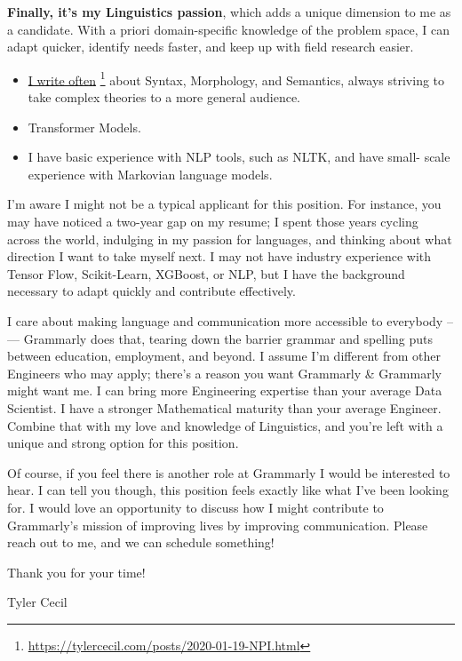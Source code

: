 \documentclass[]{article}
\newcommand{\cvcolor}[1]{{\color{MidnightBlue}#1}}
\newcommand{\hl}[1]{\cvcolor{\textbf{#1}}}
\renewcommand{\cite}[2]{\href{#2}{#1} \footnote{\href{#2}{#2}}}
\begin{document}
\begin{adjustwidth}{40pt}{40pt}
  \hl{Finally, it's my Linguistics passion}, which adds a unique dimension
  to me as a candidate. With a priori domain-specific knowledge of the problem
  space, I can adapt quicker, identify needs faster, and keep up with field
  research easier.
  \begin{itemize}
    \item \cite{I write
      often}{https://tylercecil.com/posts/2020-01-19-NPI.html} about Syntax,
      Morphology, and Semantics, always striving to take complex theories to a
      more general audience.
    \item Transformer Models.
    \item I have basic experience with NLP tools, such as NLTK, and have small-
      scale experience with Markovian language models.
  \end{itemize}\medskip

  I'm aware I might not be a typical applicant for this position. For instance,
  you may have noticed a two-year gap on my resume; I spent those years cycling
  across the world, indulging in my passion for languages, and thinking about
  what direction I want to take myself next. I may not have industry experience
  with Tensor Flow, Scikit-Learn, XGBoost, or NLP, but I have the background
  necessary to adapt quickly and contribute effectively.\medskip

  I care about making language and communication more accessible to everybody
  --— Grammarly does that, tearing down the barrier grammar and spelling puts
  between education, employment, and beyond. I assume I'm different from
  other Engineers who may apply; there's a reason you want Grammarly &
  Grammarly might want me. I can bring more Engineering expertise than your
  average Data Scientist. I have a stronger Mathematical maturity than your
  average Engineer. Combine that with my love and knowledge of Linguistics,
  and you're left with a unique and strong option for this position. \medskip

  Of course, if you feel there is another role at Grammarly I would be
  interested to hear. I can tell you though, this position feels exactly like
  what I've been looking for. I would love an opportunity to discuss how I
  might contribute to Grammarly's mission of improving lives by improving
  communication. Please reach out to me, and we can schedule something!
  \bigskip

  Thank you for your time!

  Tyler Cecil
\end{adjustwidth}
\end{document}

